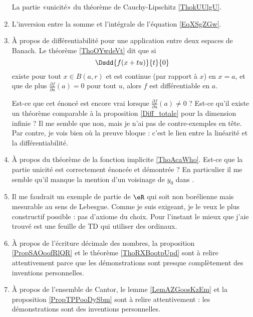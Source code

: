 \begin{enumerate}
        La partie «unicité» du théorème de Cauchy-Lipschitz \ref{ThokUUlgU}.
    \item
        L'inversion entre la somme et l'intégrale de l'équation \eqref{EqXSgZGw}.
    \item   \label{ItemLPrIWZhPg}
        À propos de différentiabilité pour une application entre deux espaces de Banach. Le théorème \ref{ThoOYwdeVt} dit que si
    \begin{equation}
        \Dsdd{ f(x+tu) }{t}{0}
    \end{equation}
    existe pour tout \( x\in B(a,r)\) et est continue (par rapport à \( x\)) en \( x=a\), et que de plus \( \frac{ \partial f }{ \partial u }(a)=0\) pour tout \( u\), alors \( f\) est différentiable en \( a\).

    Est-ce que cet énoncé est encore vrai lorsque \( \frac{ \partial f }{ \partial u }(a)\neq 0\) ? Est-ce qu'il existe un théorème comparable à la proposition \ref{Diff_totale} pour la dimension infinie ? Il me semble que non, mais je n'ai pas de contre-exemples en tête. Par contre, je vois bien où la preuve bloque : c'est le lien entre la linéarité et la différentiabilité.


    \item

        À propos du théorème de la fonction implicite \ref{ThoAcaWho}. Est-ce que la partie unicité est correctement énoncée et démontrée ? En particulier il me semble qu'il manque la mention d'un voisinage de \( y_0\) dans \cite{SNPdukn}.

    \item

        Il me faudrait un exemple de partie de \( \eR\) qui soit non borélienne mais mesurable au sens de Lebesgue. Comme je suis exigeant, je le veux le plus constructif possible : pas d'axiome du choix. Pour l'instant le mieux que j'aie trouvé est une feuille de TD\cite{XSHoosgoQa} qui utiliser des ordinaux.

    \item

        À propos de l'écriture décimale des nombres, la proposition \ref{PropSAOoofRlQR} et le théorème \ref{ThoRXBootpUpd} sont à relire attentivement parce que les démonstrations sont presque complètement des inventions personnelles.

    \item

        À propos de l'ensemble de Cantor, le lemme \ref{LemAZGoosKzEm} et la proposition \ref{PropTPPooDySbm} sont à relire attentivement : les démonstrations sont des inventions personnelles.

\end{enumerate}

